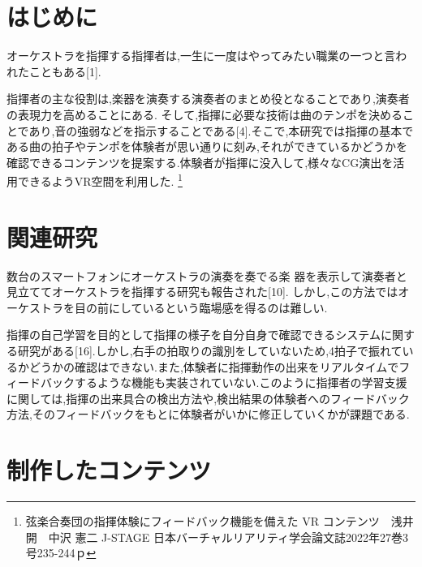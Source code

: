 \documentclass[uplatex]{jsarticle}   %
\begin{document}

\vspace{3mm}




\section{はじめに}
オーケストラを指揮する指揮者は,一生に一度はやってみたい職業の一つと言われたこともある[1].

指揮者の主な役割は,楽器を演奏する演奏者のまとめ役となることであり,演奏者の表現力を高めることにある.
そして,指揮に必要な技術は曲のテンポを決めることであり,音の強弱などを指示することである[4].そこで,本研究では指揮の基本である曲の拍子やテンポを体験者が思い通りに刻み,それができているかどうかを確認できるコンテンツを提案する.体験者が指揮に没入して,様々なCG演出を活用できるようVR空間を利用した.
\footnote{弦楽合奏団の指揮体験にフィードバック機能を備えた VR コンテンツ　浅井 開　中沢 憲二
J-STAGE 日本バーチャルリアリティ学会論文誌2022年27巻3号235-244ｐ
}

\section{関連研究}
数台のスマートフォンにオーケストラの演奏を奏でる楽 器を表示して演奏者と見立ててオーケストラを指揮する研究も報告された[10].
しかし,この方法ではオーケストラを目の前にしているという臨場感を得るのは難しい.

指揮の自己学習を目的として指揮の様子を自分自身で確認できるシステムに関する研究がある[16].しかし,右手の拍取りの識別をしていないため,4拍子で振れているかどうかの確認はできない.また,体験者に指揮動作の出来をリアルタイムでフィードバックするような機能も実装されていない.このように指揮者の学習支援に関しては,指揮の出来具合の検出方法や,検出結果の体験者へのフィードバック方法,そのフィードバックをもとに体験者がいかに修正していくかが課題である.


\section{制作したコンテンツ}
\end{document}
